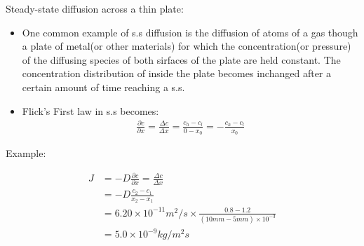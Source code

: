 \documentclass{article}
\begin{document}
Steady-state diffusion across a thin plate:
\begin{itemize}
    \item One common example of s.s diffusion is the diffusion of atoms of a gas though a plate of metal(or other materials) for which the concentration(or pressure) of the diffusing species of both sirfaces of the plate are held constant. The concentration distribution of inside the plate becomes inchanged after a certain amount of time reaching a s.s.
    \item Flick's First law in s.s becomes: \\
    
    \begin{equation}
        \begin{split}
            \frac{\partial c}{\partial x} = \frac{\Delta c}{\Delta x}  = \frac{c_h - c_l}{0-x_0} = - \frac{c_h - c_l}{x_0}
        \end{split}
    \end{equation}
\end{itemize}

Example:

\begin{equation}
    \begin{split}
    J &= -D\frac{\partial c}{\partial x} = \frac{\Delta c}{\Delta x} \\
    &= -D \frac{c_2-c_1}{x_2-x_1} \\
    &= 6.20 \times 10^{-11} m^2/s \times \frac{0.8-1.2}{(10mm -5mm) \times 10^{-3}} \\
    &= 5.0\times 10^{-9} kg/m^2 s 
\end{split}
\end{equation}
\end{document}
